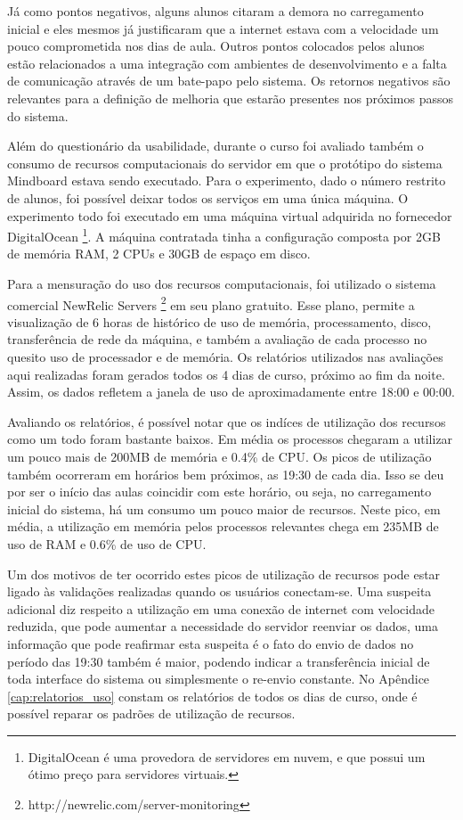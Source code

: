 Já como pontos negativos, alguns alunos citaram a demora no carregamento inicial e eles mesmos já justificaram que a internet estava com a velocidade um pouco comprometida nos dias de aula. Outros pontos colocados pelos alunos estão relacionados a uma integração com ambientes de desenvolvimento e a falta de comunicação através de um bate-papo pelo sistema. Os retornos negativos são relevantes para a definição de melhoria que estarão presentes nos próximos passos do sistema.

Além do questionário da usabilidade, durante o curso foi avaliado também o consumo de recursos computacionais do servidor em que o protótipo do sistema Mindboard estava sendo executado. Para o experimento, dado o número restrito de alunos, foi possível deixar todos os serviços em uma única máquina. O experimento todo foi executado em uma máquina virtual adquirida no fornecedor DigitalOcean \footnote{DigitalOcean é uma provedora de servidores em nuvem, e que possui um ótimo preço para servidores virtuais.}. A máquina contratada tinha a configuração composta por 2GB de memória RAM, 2 CPUs e 30GB de espaço em disco.

Para a mensuração do uso dos recursos computacionais, foi utilizado o sistema comercial NewRelic Servers \footnote{http://newrelic.com/server-monitoring} em seu plano gratuito. Esse plano, permite a visualização de 6 horas de histórico de uso de memória, processamento, disco, transferência de rede da máquina, e também a avaliação de cada processo no quesito uso de processador e de memória. Os relatórios utilizados nas avaliações aqui realizadas foram gerados todos os 4 dias de curso, próximo ao fim da noite. Assim, os dados refletem a janela de uso de aproximadamente entre 18:00 e 00:00.

Avaliando os relatórios, é possível notar que os indíces de utilização dos recursos como um todo foram bastante baixos. Em média os processos chegaram a utilizar um pouco mais de 200MB de memória e 0.4\% de CPU. Os picos de utilização também ocorreram em horários bem próximos, as 19:30 de cada dia. Isso se deu por ser o início das aulas coincidir com este horário, ou seja, no carregamento inicial do sistema, há um consumo um pouco maior de recursos. Neste pico, em média, a utilização em memória pelos processos relevantes chega em 235MB de uso de RAM e 0.6\% de uso de CPU.

Um dos motivos de ter ocorrido estes picos de utilização de recursos pode estar ligado às validações realizadas quando os usuários conectam-se. Uma suspeita adicional diz respeito a utilização em uma conexão de internet com velocidade reduzida, que pode aumentar a necessidade do servidor reenviar os dados, uma informação que pode reafirmar esta suspeita é o fato do envio de dados no período das 19:30 também é maior, podendo indicar a transferência inicial de toda interface do sistema ou simplesmente o re-envio constante. No Apêndice \ref{cap:relatorios_uso} constam os relatórios de todos os dias de curso, onde é possível reparar os padrões de utilização de recursos.

